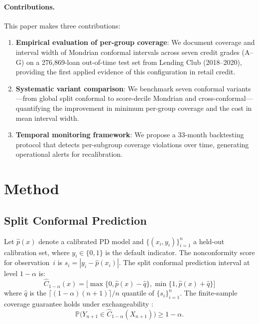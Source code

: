 \documentclass[pmlr]{jmlr}
\newcommand{\PD}{\hat{p}}
\newcommand{\PP}{\mathbb{P}}
\newcommand{\Ccal}{\hat{C}_{1-\alpha}}
\begin{document}
\paragraph{Contributions.}
This paper makes three contributions:
\begin{enumerate}
    \item \textbf{Empirical evaluation of per-group coverage}: We document
    coverage and interval width of Mondrian conformal intervals across seven
    credit grades (A--G) on a 276{,}869-loan out-of-time test set from Lending
    Club (2018--2020), providing the first applied evidence of this
    configuration in retail credit.
    \item \textbf{Systematic variant comparison}: We benchmark seven conformal
    variants---from global split conformal to score-decile Mondrian and
    cross-conformal---quantifying the improvement in minimum per-group coverage
    and the cost in mean interval width.
    \item \textbf{Temporal monitoring framework}: We propose a 33-month
    backtesting protocol that detects per-subgroup coverage violations over
    time, generating operational alerts for recalibration.
\end{enumerate}

\section{Method}
\label{sec:method}

\subsection{Split Conformal Prediction}

Let $\PD(x)$ denote a calibrated PD model and $\{(x_i, y_i)\}_{i=1}^{n}$ a
held-out calibration set, where $y_i \in \{0,1\}$ is the default indicator.
The nonconformity score for observation~$i$ is $s_i = |y_i - \PD(x_i)|$.  The
split conformal prediction interval at level $1-\alpha$ is:
\begin{equation}
    \Ccal(x) = \bigl[\max\{0, \PD(x) - \hat{q}\}, \min\{1, \PD(x) + \hat{q}\}\bigr]
    \label{eq:split-conformal}
\end{equation}
where $\hat{q}$ is the $\lceil(1-\alpha)(n+1)\rceil / n$ quantile of
$\{s_i\}_{i=1}^n$.  The finite-sample coverage guarantee holds under
exchangeability \citep{vovk2005}:
\begin{equation}
    \PP\bigl(Y_{n+1} \in \Ccal(X_{n+1})\bigr) \geq 1 - \alpha.
    \label{eq:coverage-guarantee}
\end{equation}
\end{document}
